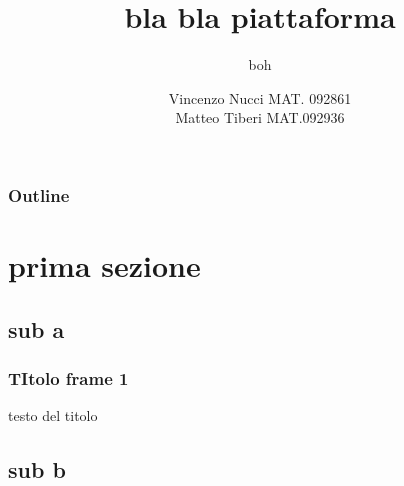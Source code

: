 \documentclass{beamer}
\title{bla bla piattaforma}
\subtitle{boh}
\author{Vincenzo Nucci MAT. 092861 \\ Matteo Tiberi MAT.092936}
\institute{Università di Camerino}
\begin{document}
	\begin{frame}
		\titlepage
	\end{frame}

\begin{frame}
\frametitle{Outline}
\tableofcontents
\end{frame}

\section{prima sezione}

\subsection{sub a}

\begin{frame}
	\frametitle{TItolo frame 1}
	testo del titolo
\end{frame}

\begin{frame}

\end{frame}
\subsection{sub b}
\end{document}
